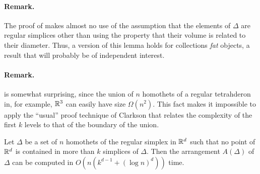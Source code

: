 \documentclass[lotsofwhite]{patmorin}
\begin{document}
\paragraph{Remark.} The proof of  makes almost no use
of the assumption that the elements of $\Delta$ are regular simplices other
than using the property that their volume is related to their diameter.
Thus, a version of this lemma holds for collections \emph{fat} objects, a
result that will probably be of independent interest.

\paragraph{Remark.}  is somewhat surprising, since the
union of $n$ homothets of a regular tetrahderon in, for example, $\mathbb{R}^3$ can
easily have size $\Omega(n^2)$.  This fact makes it impossible to apply the
``usual'' proof technique of Clarkson that relates the complexity of the
first $k$ levels to that of the boundary of the union.

\begin{lem}
  Let $\Delta$ be a set of $n$ homothets of the regular simplex in
  $\mathbb{R}^d$ such that no point of $\mathbb{R}^d$ is contained in more than $k$
  simplices of $\Delta$.  Then the arrangement $A(\Delta)$ of $\Delta$
  can be computed in $O(n(k^{d-1}+(\log n)^{d}))$ time.
\end{lem}
\end{document}
